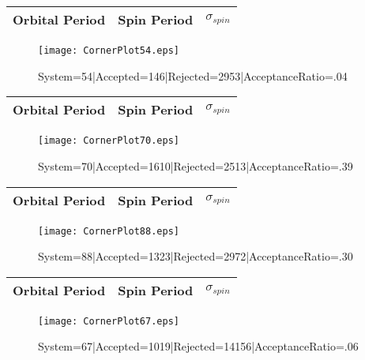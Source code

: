 \documentclass[10pt]{article}
\begin{document}
\begin{center}
        \begin{tabular}{|c|c|c|}
        \hline
Orbital Period & Spin Period & $\sigma_{spin}$ \\
 \hline
        \end{tabular}
        \end{center}
\begin{figure}[h] 
        \texttt{[image: CornerPlot54.eps]}
        \caption{System=54|Accepted=146|Rejected=2953|AcceptanceRatio=.04}
        \label{S54}
        \centering
        \end{figure}
\begin{center}
        \begin{tabular}{|c|c|c|}
        \hline
Orbital Period & Spin Period & $\sigma_{spin}$ \\
 \hline
        \end{tabular}
        \end{center}
\begin{figure}[h] 
        \texttt{[image: CornerPlot70.eps]}
        \caption{System=70|Accepted=1610|Rejected=2513|AcceptanceRatio=.39}
        \label{S70}
        \centering
        \end{figure}
\begin{center}
        \begin{tabular}{|c|c|c|}
        \hline
Orbital Period & Spin Period & $\sigma_{spin}$ \\
 \hline
        \end{tabular}
        \end{center}
\begin{figure}[h] 
        \texttt{[image: CornerPlot88.eps]}
        \caption{System=88|Accepted=1323|Rejected=2972|AcceptanceRatio=.30}
        \label{S88}
        \centering
        \end{figure}
\begin{center}
        \begin{tabular}{|c|c|c|}
        \hline
Orbital Period & Spin Period & $\sigma_{spin}$ \\
 \hline
        \end{tabular}
        \end{center}
\begin{figure}[h] 
        \texttt{[image: CornerPlot67.eps]}
        \caption{System=67|Accepted=1019|Rejected=14156|AcceptanceRatio=.06}
        \label{S67}
        \centering
        \end{figure}
\end{document}
